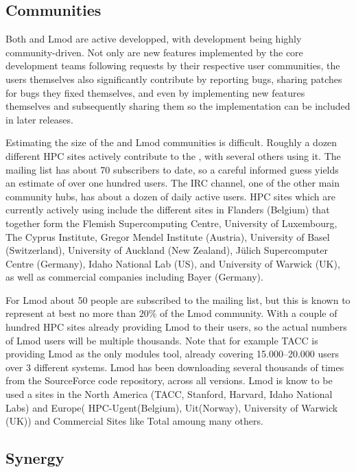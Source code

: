 \subsection{Communities}

Both \easybuild{} and Lmod are active developped, with development being
highly community-driven. Not only are new features implemented by the core
development teams following requests by their respective user communities, the
users themselves also significantly contribute by reporting bugs, sharing patches
for bugs they fixed themselves, and even by implementing new features themselves
and subsequently sharing them so the implementation can be included in later
releases.

Estimating the size of the \easybuild{} and Lmod communities is difficult.
Roughly a dozen different HPC sites actively contribute to the \easybuild{}, with
several others using it. The \easybuild{} mailing list has about 70 subscribers
to date, so a careful informed guess yields an estimate of over one hundred
users. The \easybuild{} IRC channel, one of the other main community hubs, has
about a dozen of daily active users. HPC sites which are currently actively using
\easybuild{} include the different sites in Flanders (Belgium) that together form
the Flemish Supercomputing Centre, University of Luxembourg, The Cyprus Institute,
Gregor Mendel Institute (Austria), University of Basel (Switzerland), University
of Auckland (New Zealand), J\"ulich Supercomputer Centre (Germany), Idaho
National Lab (US), and University of Warwick (UK), as well as commercial
companies including Bayer (Germany).

For Lmod about 50 people are subscribed to the mailing list, but this
is known to represent at best no more than $20\%$ of the Lmod community. With a
couple of hundred HPC sites already providing Lmod to their users, so the actual
numbers of Lmod users will be multiple thousands. Note that for example TACC is
providing Lmod as the only modules tool, already covering 15.000--20.000 users
over 3 different systems. Lmod has been downloading several thousands of times
from the SourceForce code repository, across all versions.
Lmod is know to be used a sites in the North America (TACC, Stanford, Harvard,
Idaho National Labs) and Europe( HPC-Ugent(Belgium), Uit(Norway),
University of Warwick (UK)) and Commercial Sites like Total amoung
many others.

\subsection{Synergy}

